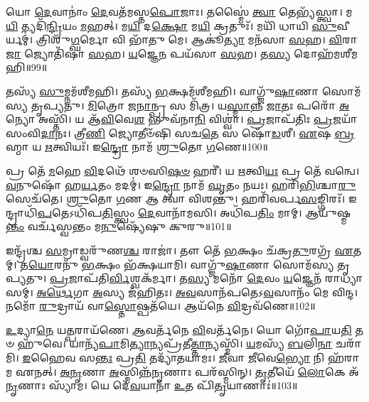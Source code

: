 𑌯𑍋 \ul{𑌦𑍇}\-𑌵𑌾𑌨𑌾𑌂॑ \ul{𑌦𑍇}\-𑌵𑌤᳴𑌮𑌸𑍍𑌤\-\ul{𑌪𑍋}\-𑌜𑌾𑌃।
𑌤𑌸𑍍𑌮𑍈॑ \ul{𑌤𑍍𑌵𑌾} 𑌤𑍇𑌭𑍍𑌯᳴𑌸𑍍𑌤𑍍𑌵𑌾।
𑌮\-\ul{𑌯𑌿} 𑌤𑍍𑌯𑌦𑌿᳴\-\ul{𑌨𑍍𑌦𑍍𑌰𑌿}\-𑌯𑌂 \ul{𑌮}\-𑌹𑌤𑍍।
𑌮\-\ul{𑌯𑌿} 𑌦\-\ul{𑌕𑍍𑌷𑍋} 𑌮\-\ul{𑌯𑌿} 𑌕𑍍𑌰𑌤𑍁𑌃᳴।
𑌮𑌯𑌿᳴ 𑌧𑌾𑌯𑌿 \ul{𑌸𑍁}\-𑌵𑍀𑌰𑍍𑌯𑌮𑍍॑।
𑌤𑍍𑌰𑌿𑌶𑍁᳴\-\ul{𑌗𑍍𑌘}\-𑌰𑍍𑌮𑍋 𑌵𑌿 𑌭𑌾᳴𑌤𑍁 𑌮𑍇।
𑌆𑌕𑍂॑\-\ul{𑌤𑍍𑌯𑌾} 𑌮𑌨᳴𑌸𑌾 \ul{𑌸}\-𑌹।
\-\ul{𑌵𑌿}\-𑌰𑌾\-\ul{𑌜𑌾} 𑌜𑍍𑌯𑍋𑌤𑌿᳴𑌷𑌾 \ul{𑌸}\-𑌹।
\-\ul{𑌯}\-𑌜𑍍𑌞𑍇\-\ul{𑌨} 𑌪𑌯᳴𑌸𑌾 \ul{𑌸}\-𑌹।
𑌤\-\ul{𑌸𑍍𑌯} 𑌦𑍋𑌹᳴𑌮𑌶𑍀𑌮𑌹𑌿॥99॥

𑌤𑌸𑍍𑌯᳴ \ul{𑌸𑍁}\-𑌮𑍍𑌨𑌮᳴𑌶𑍀𑌮𑌹𑌿।
𑌤𑌸𑍍𑌯᳴ \ul{𑌭}\-𑌕𑍍𑌷𑌮᳴𑌶𑍀𑌮𑌹𑌿।
𑌵𑌾𑌗𑍍𑌜𑍁᳴\-\ul{𑌷𑌾}\-𑌣𑌾 𑌸𑍋𑌮᳴𑌸𑍍𑌯 𑌤𑍃𑌪𑍍𑌯𑌤𑍁।
\-\ul{𑌮𑌿}\-𑌤𑍍𑌰𑍋 𑌜\-\ul{𑌨𑌾}\-𑌨𑍍𑌪𑍍𑌰 𑌸 𑌮𑌿᳴𑌤𑍍𑌰।
𑌯\-\ul{𑌸𑍍𑌮𑌾}\-𑌨𑍍𑌨 \ul{𑌜𑌾}\-𑌤𑌃 𑌪𑌰𑍋᳴ \ul{𑌅}\-𑌨𑍍𑌯𑍋 𑌅𑌸𑍍𑌤𑌿᳴।
𑌯 𑌆᳴\-\ul{𑌵𑌿}\-𑌵𑍇\-\ul{𑌶} 𑌭𑍁𑌵᳴𑌨𑌾\-\ul{𑌨𑌿} 𑌵𑌿𑌶𑍍𑌵𑌾॑।
\-\ul{𑌪𑍍𑌰}\-𑌜𑌾\-𑌪᳴𑌤𑌿𑌃 \ul{𑌪𑍍𑌰}\-𑌜𑌯𑌾᳴ 𑌸𑌂𑌵𑌿\-\ul{𑌦𑌾}\-𑌨𑌃।
𑌤𑍍𑌰𑍀\-\ul{𑌣𑌿} 𑌜𑍍𑌯𑍋𑌤𑍀𑍞᳴𑌷𑌿 𑌸𑌚\-\ul{𑌤𑍇} 𑌸 𑌷𑍋᳴\-\ul{𑌡}\-𑌶𑍀।
\-\ul{𑌏}\-𑌷 \ul{𑌬𑍍𑌰}\-𑌹𑍍𑌮𑌾 𑌯 \ul{𑌋}\-𑌤𑍍𑌵𑌿𑌯𑌃᳴।
𑌇\-\ul{𑌨𑍍𑌦𑍍𑌰𑍋} 𑌨𑌾𑌮᳴ \ul{𑌶𑍍𑌰𑍁}\-𑌤𑍋 \ul{𑌗}\-𑌣𑍇॥100॥

𑌪𑍍𑌰 𑌤𑍇᳴ \ul{𑌮}\-𑌹𑍇 \ul{𑌵𑌿}\-𑌦𑌥𑍇᳴ 𑌶𑍞𑌸𑌿\-\ul{𑌷}\-\-\ul{𑍞} 𑌹𑌰𑍀॑।
𑌯 \ul{𑌋}\-𑌤𑍍𑌵𑌿\-\ul{𑌯𑌃} 𑌪𑍍𑌰 𑌤𑍇᳴ 𑌵𑌨𑍍𑌵𑍇।
\-\ul{𑌵}\-𑌨𑍁𑌷𑍋᳴ 𑌹\-\ul{𑌰𑍍𑌯}\-𑌤𑌂 𑌮𑌦𑌮𑍍॑।
𑌇\-\ul{𑌨𑍍𑌦𑍍𑌰𑍋} 𑌨𑌾𑌮᳴ \ul{𑌘𑍃}\-𑌤𑌂 𑌨𑌯𑌃।
𑌹𑌰𑌿᳴\-\ul{𑌭𑌿}\-𑌶𑍍𑌚𑌾\-\ul{𑌰𑍁} 𑌸𑍇𑌚᳴𑌤𑍇।
\-\ul{𑌶𑍍𑌰𑍁}\-𑌤𑍋 \ul{𑌗}\-𑌣 𑌆 𑌤𑍍𑌵𑌾᳴ 𑌵𑌿𑌶𑌨𑍍𑌤𑍁।
𑌹𑌰𑌿᳴𑌵𑌰𑍍𑌪\-\ul{𑌸}\-𑌙𑍍𑌗𑌿𑌰𑌃᳴।
𑌇𑌨𑍍𑌦𑍍𑌰𑌾𑌧𑌿᳴\-\ul{𑌪}\-𑌤𑍇\-𑌽𑌧𑌿᳴𑌪\-\ul{𑌤𑌿}\-𑌸𑍍𑌤𑍍𑌵𑌂 \ul{𑌦𑍇}\-𑌵𑌾𑌨𑌾᳴𑌮𑌸𑌿।
𑌅𑌧𑌿᳴𑌪\-\ul{𑌤𑌿𑌂} 𑌮𑌾𑌮𑍍।
𑌆𑌯𑍁᳴𑌷𑍍𑌮\-\ul{𑌨𑍍𑌤𑌂} 𑌵𑌰𑍍𑌚᳴𑌸𑍍𑌵𑌨𑍍𑌤𑌂 𑌮\-\ul{𑌨𑍁}\-𑌷𑍍𑌯𑍇᳴𑌷𑍁 𑌕𑍁𑌰𑍁॥101॥

𑌇𑌨𑍍𑌦𑍍𑌰᳴𑌶𑍍𑌚 \ul{𑌸}\-𑌮𑍍𑌰𑌾𑌡𑍍𑌵𑌰𑍁᳴𑌣\-\ul{𑌶𑍍𑌚} 𑌰𑌾𑌜𑌾॑।
𑌤𑍗 𑌤𑍇᳴ \ul{𑌭}\-𑌕𑍍𑌷𑌂 𑌚᳴𑌕𑍍𑌰\-\ul{𑌤𑍁}\-𑌰𑌗𑍍𑌰᳴ \ul{𑌏}\-𑌤𑌮𑍍।
𑌤\-\ul{𑌯𑍋}\-𑌰𑌨𑍁᳴ \ul{𑌭}\-𑌕𑍍𑌷𑌂 𑌭᳴𑌕𑍍𑌷𑌯𑌾𑌮𑌿।
𑌵𑌾𑌗𑍍𑌜𑍁᳴\-\ul{𑌷𑌾}\-𑌣𑌾 𑌸𑍋𑌮᳴𑌸𑍍𑌯 𑌤𑍃𑌪𑍍𑌯𑌤𑍁।
\-\ul{𑌪𑍍𑌰}\-𑌜𑌾𑌪᳴𑌤𑌿\-\ul{𑌰𑍍𑌵𑌿}\-𑌶𑍍𑌵𑌕᳴𑌰𑍍𑌮𑌾।
𑌤\-\ul{𑌸𑍍𑌯} 𑌮𑌨𑍋᳴ \ul{𑌦𑍇}\-𑌵𑌂 \ul{𑌯}\-𑌜𑍍𑌞𑍇𑌨᳴ 𑌰𑌾𑌧𑍍𑌯𑌾𑌸𑌮𑍍।
\-\ul{𑌅}\-\-\ul{𑌰𑍍𑌥𑍇}\-𑌗𑌾 \ul{𑌅}\-𑌸𑍍𑌯 𑌜᳴𑌹𑌿𑌤𑌃।
\-\ul{𑌅}\-\-\ul{𑌵}\-𑌸𑌾𑌨᳴𑌪𑌤𑍇\-𑌽\-\ul{𑌵}\-𑌸𑌾𑌨𑌂᳴ 𑌮𑍇 𑌵𑌿𑌨𑍍𑌦।
𑌨𑌮𑍋᳴ \ul{𑌰𑍁}\-𑌦𑍍𑌰𑌾𑌯᳴ 𑌵𑌾\-\ul{𑌸𑍍𑌤𑍋}\-𑌷𑍍𑌪𑌤᳴𑌯𑍇।
𑌆𑌯᳴𑌨𑍇 \ul{𑌵𑌿}\-𑌦𑍍𑌰𑌵᳴𑌣𑍇॥102॥

\-\ul{𑌉}\-𑌦𑍍𑌯𑌾\-\ul{𑌨𑍇} 𑌯\-\ul{𑌤𑍍𑌪}\-𑌰𑌾𑌯᳴𑌣𑍇।
\-\ul{𑌆}\-𑌵𑌰𑍍𑌤᳴𑌨𑍇 \ul{𑌵𑌿}\-𑌵𑌰𑍍𑌤᳴𑌨𑍇।
𑌯𑍋 𑌗𑍋᳴\-\ul{𑌪𑌾}\-𑌯\-\ul{𑌤𑌿} 𑌤𑍞 𑌹𑍁᳴𑌵𑍇।
𑌯𑌾𑌨𑍍𑌯᳴\-\ul{𑌪𑌾}\-𑌮𑌿\-\ul{𑌤𑍍𑌯𑌾}\-𑌨𑍍𑌯𑌪𑍍𑌰᳴𑌤𑍀\-\ul{𑌤𑍍𑌤𑌾}\-𑌨𑍍𑌯𑌸𑍍𑌮𑌿᳴।
\-\ul{𑌯}\-𑌮𑌸𑍍𑌯᳴ \ul{𑌬}\-𑌲𑌿\-\ul{𑌨𑌾} 𑌚𑌰𑌾᳴𑌮𑌿।
\-\ul{𑌇}\-𑌹𑍈𑌵 𑌸\-\ul{𑌨𑍍𑌤𑌃} 𑌪𑍍𑌰\-\ul{𑌤𑌿} 𑌤𑌦𑍍𑌯𑌾᳴𑌤𑌯𑌾𑌮𑌃।
\-\ul{𑌜𑍀}\-𑌵𑌾 \ul{𑌜𑍀}\-𑌵𑍇\-\ul{𑌭𑍍𑌯𑍋} 𑌨𑌿 𑌹᳴𑌰𑌾𑌮 𑌏𑌨𑌤𑍍।
\-\ul{𑌅}\-\-\ul{𑌨𑍃}\-𑌣𑌾 \ul{𑌅}\-𑌸𑍍𑌮𑌿𑌨𑍍𑌨᳴\-\ul{𑌨𑍃}\-𑌣𑌾𑌃 𑌪𑌰᳴𑌸𑍍𑌮𑌿𑌨𑍍।
\-\ul{𑌤𑍃}\-𑌤𑍀𑌯𑍇᳴ \ul{𑌲𑍋}\-𑌕𑍇 𑌅᳴\-\ul{𑌨𑍃}\-𑌣𑌾𑌃 𑌸𑍍𑌯𑌾᳴𑌮।
𑌯𑍇 𑌦𑍇᳴\-\ul{𑌵}\-𑌯𑌾𑌨𑌾᳴ \ul{𑌉}\-𑌤 𑌪𑌿᳴\-\ul{𑌤𑍃}\-𑌯𑌾𑌣𑌾𑌃॑॥103॥

